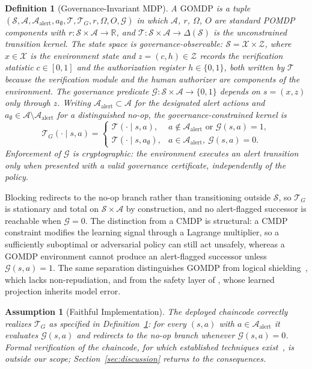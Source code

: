 \documentclass[letterpaper]{article} %
\newtheorem{definition}{Definition}
\newtheorem{assumption}{Assumption}
\newcommand{\GOMDP}{\text{GOMDP}}
\newcommand{\Rset}{\mathbb{R}}
\newcommand{\calA}{\mathcal{A}}
\newcommand{\calS}{\mathcal{S}}
\newcommand{\calT}{\mathcal{T}}
\newcommand{\calG}{\mathcal{G}}
\newcommand{\calX}{\mathcal{X}}
\newcommand{\calZ}{\mathcal{Z}}
\begin{document}
\begin{definition}[Governance-Invariant MDP]
\label{def:gomdp}
A $\GOMDP$ is a tuple $(\calS, \calA, \calA_{\mathrm{alert}}, a_\emptyset, \calT, \calT_G, r, \Omega, O, \calG)$ in which $\calA$, $r$, $\Omega$, $O$ are standard POMDP components with $r:\calS\times\calA\to\Rset$, and $\calT:\calS\times\calA\to\Delta(\calS)$ is the unconstrained transition kernel. The state space is \emph{governance-observable}: $\calS=\calX\times\calZ$, where $x\in\calX$ is the environment state and $z=(c,h)\in\calZ$ records the verification statistic $c\in[0,1]$ and the authorization register $h\in\{0,1\}$, both written by $\calT$ because the verification module and the human authorizer are components of the environment. The governance predicate $\calG:\calS\times\calA\to\{0,1\}$ depends on $s=(x,z)$ only through $z$. Writing $\calA_{\mathrm{alert}}\subset\calA$ for the designated alert actions and $a_\emptyset\in\calA\setminus\calA_{\mathrm{alert}}$ for a distinguished no-op, the governance-constrained kernel is
\begin{equation}
\calT_G(\cdot \mid s,a) =
\begin{cases}
\calT(\cdot \mid s,a), & a\notin\calA_{\mathrm{alert}} \text{ or } \calG(s,a)=1,\\[2pt]
\calT(\cdot \mid s,a_\emptyset), & a\in\calA_{\mathrm{alert}},\ \calG(s,a)=0.
\end{cases}
\label{eq:kernel}
\end{equation}
Enforcement of $\calG$ is \emph{cryptographic}: the environment executes an alert transition only when presented with a valid governance certificate, independently of the policy.
\end{definition}

Blocking redirects to the no-op branch rather than transitioning outside $\calS$, so $\calT_G$ is stationary and total on $\calS\times\calA$ by construction, and no alert-flagged successor is reachable when $\calG=0$. The distinction from a CMDP is structural: a CMDP constraint modifies the learning signal through a Lagrange multiplier, so a sufficiently suboptimal or adversarial policy can still act unsafely, whereas a $\GOMDP$ environment cannot produce an alert-flagged successor unless $\calG(s,a)=1$. The same separation distinguishes GOMDP from logical shielding~\citep{alshiekh2018}, which lacks non-repudiation, and from the safety layer of \citet{dalal2018}, whose learned projection inherits model error.

\begin{assumption}[Faithful Implementation]
\label{ass:impl}
The deployed chaincode correctly realizes $\calT_G$ as specified in Definition~\ref{def:gomdp}: for every $(s,a)$ with $a\in\calA_{\mathrm{alert}}$ it evaluates $\calG(s,a)$ and redirects to the no-op branch whenever $\calG(s,a)=0$. Formal verification of the chaincode, for which established techniques exist~\citep{bhargavan2016}, is outside our scope; Section~\ref{sec:discussion} returns to the consequences.
\end{assumption}
\end{document}
